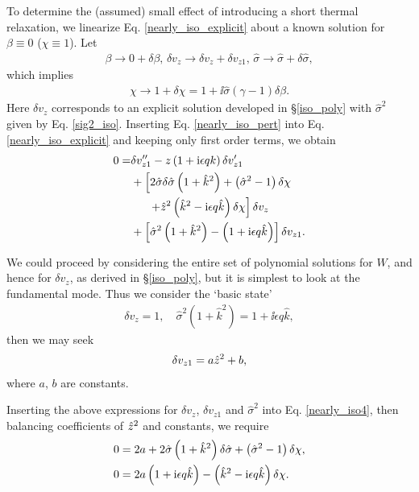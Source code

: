 To determine the (assumed) small effect of introducing a short thermal
relaxation, we linearize Eq. \ref{nearly_iso_explicit} about a known 
solution for $\beta\equiv0$  ($\chi\equiv 1$). 
Let 
\begin{align}\label{nearly_iso_pert}
  \beta \to 0 + \delta\beta,\, \delta v_z\to \delta v_z+\delta
  v_{z1},\,\hat{\sigma} \to \hat{\sigma} + \delta\hat{\sigma}, 
\end{align}
which implies 
\begin{align}
  \chi \to 1 + \delta\chi = 1 + \ii \hat{\sigma}\left(\gamma-1\right)\delta\beta.
\end{align}
Here $\delta v_z$ corresponds to an explicit solution developed in
\S\ref{iso_poly} with  $\hat{\sigma}^2$ given by Eq. \ref{sig2_iso}. Inserting
Eq. \ref{nearly_iso_pert} into Eq. \ref{nearly_iso_explicit}  and keeping
only first order terms, we obtain 
\begin{align}
 0 =& \delta v_{z1}^{\prime\prime} - z\left(1 + \mathrm{i}\epsilon q
   k\right)\delta v_{z1}^\prime\notag\\
 &+ \left[2\hat{\sigma}\delta\hat{\sigma}\left(1 + \hat{k}^2\right) +
   \left(\hat{\sigma}^2 - 1\right)\delta\chi \right.\notag\\
&\phantom{++} \left. + \hat{z}^2\left(\hat{k}^2 -
     \mathrm{i}\epsilon q \hat{k}\right)\delta\chi\right]\delta v_z\notag\\
 &+\left[\hat{\sigma}^2\left(1 + \hat{k}^2\right) - \left(1+\mathrm{i}\epsilon
     q \hat{k}\right)\right]\delta v_{z1}.\label{nearly_iso4}
\end{align}

We could proceed by considering the entire set of polynomial solutions
for $W$, and hence for $\delta v_z$, as derived in \S\ref{iso_poly}, but it
is simplest to look at the fundamental mode. Thus we consider the `basic state' 
 \begin{align*}
   \delta v_z = 1,\quad \hat{\sigma}^2\left(1+\hat{k}^2\right) = 1 +
   \ii\epsilon q \hat{k},
 \end{align*}
 then we may seek 
 \begin{align}
   \delta v_{z1} = a \hat{z}^2 + b,
 \end{align}
where $a$, $b$ are constants. 

Inserting the above expressions for $\delta v_z$, $\delta v_{z1}$ and
$\hat{\sigma}^2$ into Eq. \ref{nearly_iso4}, then balancing
coefficients of $\hat{z}^2$ and constants, we require
\begin{align}
0 &= 2a + 2\hat{\sigma}\left(1+\hat{k}^2\right)\delta\hat{\sigma} +
\left(\hat{\sigma}^2 -1\right)\delta\chi,\notag\\
0&= 2a\left(1+\mathrm{i}\epsilon q \hat{k}\right) - \left(\hat{k}^2 - \mathrm{i}\epsilon
q \hat{k}\right)\delta\chi.
\end{align} 

